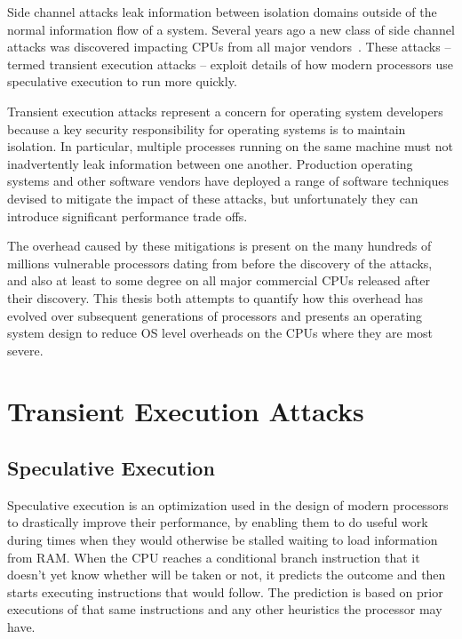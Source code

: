 \noindent
Side channel attacks leak information between isolation domains outside of the normal information flow of a system.
Several years ago a new class of side channel attacks was discovered impacting CPUs from all major vendors~\cite{lipp:meltdown, kocher:spectre}.
These attacks -- termed transient execution attacks -- exploit details of how modern processors use speculative execution to run more quickly. 

Transient execution attacks represent a concern for operating system developers because a key security responsibility for operating systems is to maintain isolation.
In particular, multiple processes running on the same machine must not inadvertently leak information between one another.
Production operating systems and other software vendors have deployed a range of software techniques devised to mitigate the impact of these attacks, but unfortunately they can introduce significant performance trade offs.

The overhead caused by these mitigations is present on the many hundreds of millions vulnerable processors dating from before the discovery of the attacks, and also at least to some degree on all major commercial CPUs released after their discovery.
This thesis both attempts to quantify how this overhead has evolved over subsequent generations of processors and presents an operating system design to reduce OS level overheads on the CPUs where they are most severe.  



\section{Transient Execution Attacks}
\subsection{Speculative Execution}
Speculative execution is an optimization used in the design of modern processors to drastically improve their performance, by enabling them to do useful work during times when they would otherwise be stalled waiting to load information from RAM.
When the CPU reaches a conditional branch instruction that it doesn't yet know whether will be taken or not, it predicts the outcome and then starts executing instructions that would follow.
The prediction is based on prior executions of that same instructions and any other heuristics the processor may have.

